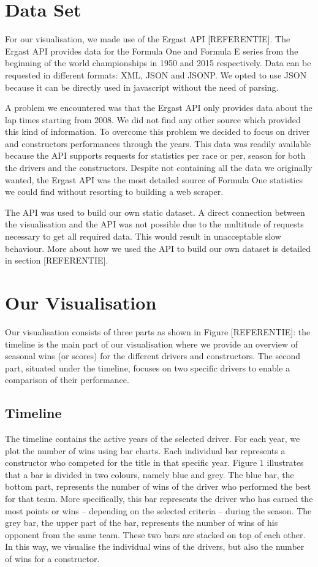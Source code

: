 \documentclass{sigchi}
\begin{document}
\section{Data Set}
For our visualisation, we made use of the Ergast API [REFERENTIE]. The Ergast API provides data for the Formula One and Formula E series from the beginning of the world championships in 1950 and 2015 respectively. Data can be requested in different formats: XML, JSON and JSONP. We opted to use JSON because it can be directly used in javascript without the need of parsing. 

A problem we encountered was that the Ergast API only provides data about the lap times starting from 2008. We did not find any other source which provided this kind of information. To overcome this problem we decided to focus on driver and constructors performances through the years. This data was readily available because the API supports requests for statistics per race or per, season for both the drivers and the constructors. Despite not containing all the data we originally wanted, the Ergast API was the most detailed source of Formula One statistics we could find without resorting to building  a web scraper. 

The API was used to build our own static dataset. A direct connection between the visualisation and the API was not possible due to the multitude of requests necessary to get all required data. This would result in unacceptable slow behaviour. More about how we used the API to build our own dataset is detailed in section [REFERENTIE]. 

\section{Our Visualisation}
Our visualisation consists of three parts as shown in Figure [REFERENTIE]: the timeline is the main part of our visualisation where we provide an overview of seasonal wins (or scores) for the different drivers and constructors. The second part, situated under the timeline, focuses on two specific drivers to enable a comparison of their performance.  

\subsection{Timeline}

The timeline contains the active years of the selected driver. For each year, we plot the number of wins using bar charts. Each individual bar represents a constructor who competed for the title in that specific year. Figure 1 illustrates that a bar is divided in two colours, namely blue and grey. The blue bar, the bottom part, represents the number of wins of the driver who performed the best for that team. More specifically, this bar represents the driver who has earned the most points or wins – depending on the selected criteria – during the season. The grey bar, the upper part of the bar, represents the number of wins of his opponent from the same team. These two bars are stacked on top of each other. In this way, we visualise the individual wins of the drivers, but also the number of wins for a constructor. 
 
\end{document}
